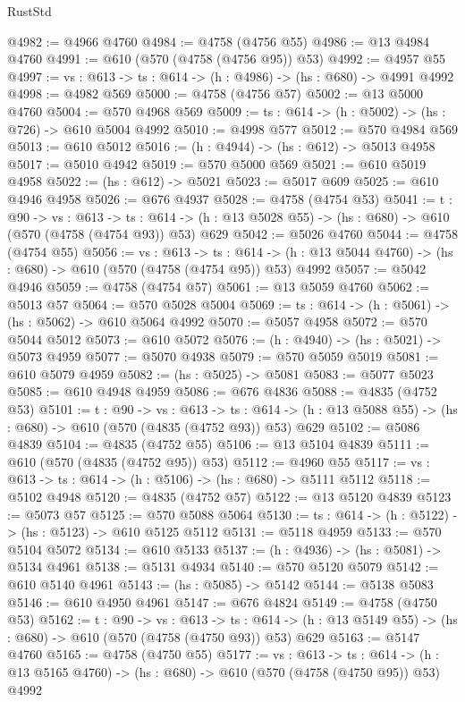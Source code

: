 \begin{lexlean}{RustStd}
\begin{coremodule}
@4982 := @4966 @4760
@4984 := @4758 (@4756 @55)
@4986 := @13 @4984 @4760
@4991 := @610 (@570 (@4758 (@4756 @95)) @53)
@4992 := @4957 @55
@4997 := {vs : @613} -> {ts : @614} -> (h : @4986) -> (hs : @680) -> @4991 @4992
@4998 := @4982 @569
@5000 := @4758 (@4756 @57)
@5002 := @13 @5000 @4760
@5004 := @570 @4968 @569
@5009 := {ts : @614} -> (h : @5002) -> (hs : @726) -> @610 @5004 @4992
@5010 := @4998 @577
@5012 := @570 @4984 @569
@5013 := @610 @5012
@5016 := (h : @4944) -> (hs : @612) -> @5013 @4958
@5017 := @5010 @4942
@5019 := @570 @5000 @569
@5021 := @610 @5019 @4958
@5022 := (hs : @612) -> @5021
@5023 := @5017 @609
@5025 := @610 @4946 @4958
@5026 := @676 @4937
@5028 := @4758 (@4754 @53)
@5041 := {t : @90} ->
  {vs : @613} ->
  {ts : @614} -> (h : @13 @5028 @55) -> (hs : @680) -> @610 (@570 (@4758 (@4754 @93)) @53) @629
@5042 := @5026 @4760
@5044 := @4758 (@4754 @55)
@5056 := {vs : @613} ->
  {ts : @614} -> (h : @13 @5044 @4760) -> (hs : @680) -> @610 (@570 (@4758 (@4754 @95)) @53) @4992
@5057 := @5042 @4946
@5059 := @4758 (@4754 @57)
@5061 := @13 @5059 @4760
@5062 := @5013 @57
@5064 := @570 @5028 @5004
@5069 := {ts : @614} -> (h : @5061) -> (hs : @5062) -> @610 @5064 @4992
@5070 := @5057 @4958
@5072 := @570 @5044 @5012
@5073 := @610 @5072
@5076 := (h : @4940) -> (hs : @5021) -> @5073 @4959
@5077 := @5070 @4938
@5079 := @570 @5059 @5019
@5081 := @610 @5079 @4959
@5082 := (hs : @5025) -> @5081
@5083 := @5077 @5023
@5085 := @610 @4948 @4959
@5086 := @676 @4836
@5088 := @4835 (@4752 @53)
@5101 := {t : @90} ->
  {vs : @613} ->
  {ts : @614} -> (h : @13 @5088 @55) -> (hs : @680) -> @610 (@570 (@4835 (@4752 @93)) @53) @629
@5102 := @5086 @4839
@5104 := @4835 (@4752 @55)
@5106 := @13 @5104 @4839
@5111 := @610 (@570 (@4835 (@4752 @95)) @53)
@5112 := @4960 @55
@5117 := {vs : @613} -> {ts : @614} -> (h : @5106) -> (hs : @680) -> @5111 @5112
@5118 := @5102 @4948
@5120 := @4835 (@4752 @57)
@5122 := @13 @5120 @4839
@5123 := @5073 @57
@5125 := @570 @5088 @5064
@5130 := {ts : @614} -> (h : @5122) -> (hs : @5123) -> @610 @5125 @5112
@5131 := @5118 @4959
@5133 := @570 @5104 @5072
@5134 := @610 @5133
@5137 := (h : @4936) -> (hs : @5081) -> @5134 @4961
@5138 := @5131 @4934
@5140 := @570 @5120 @5079
@5142 := @610 @5140 @4961
@5143 := (hs : @5085) -> @5142
@5144 := @5138 @5083
@5146 := @610 @4950 @4961
@5147 := @676 @4824
@5149 := @4758 (@4750 @53)
@5162 := {t : @90} ->
  {vs : @613} ->
  {ts : @614} -> (h : @13 @5149 @55) -> (hs : @680) -> @610 (@570 (@4758 (@4750 @93)) @53) @629
@5163 := @5147 @4760
@5165 := @4758 (@4750 @55)
@5177 := {vs : @613} ->
  {ts : @614} -> (h : @13 @5165 @4760) -> (hs : @680) -> @610 (@570 (@4758 (@4750 @95)) @53) @4992

\end{coremodule}
\end{lexlean}
